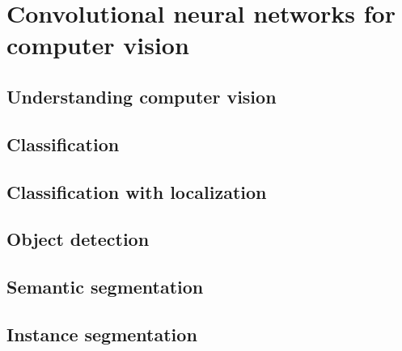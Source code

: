 \chapter{Convolutional neural networks for computer vision}
\label{image-ann}


\section{Understanding computer vision}
\label{computer-vision}

\section{Classification}
\label{classification}


\section{Classification with localization}
\label{classification-localization}


\section{Object detection}
\label{object-detection}


\section{Semantic segmentation}
\label{semantic-segmentation}


\section{Instance segmentation}
\label{instance-segmentation}


